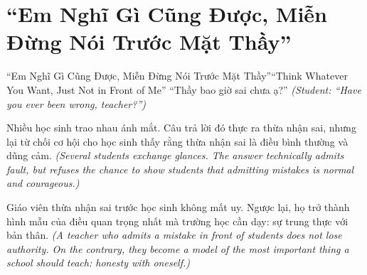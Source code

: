 \section{``Em Nghĩ Gì Cũng Được, Miễn Đừng Nói Trước Mặt Thầy''}
\begin{truyen}{``Em Nghĩ Gì Cũng Được, Miễn Đừng Nói Trước Mặt Thầy''}{``Think Whatever You Want, Just Not in Front of Me''}
 ``Thầy bao giờ sai chưa ạ?''
\textit{(Student: ``Have you ever been wrong, teacher?'')}


Nhiều học sinh trao nhau ánh mắt. Câu trả lời đó thực ra thừa nhận sai, nhưng lại từ chối cơ hội cho học sinh thấy rằng thừa nhận sai là điều bình thường và dũng cảm.
\textit{(Several students exchange glances. The answer technically admits fault, but refuses the chance to show students that admitting mistakes is normal and courageous.)}

\begin{baihoc}
Giáo viên thừa nhận sai trước học sinh không mất uy. Ngược lại, họ trở thành hình mẫu của điều quan trọng nhất mà trường học cần dạy: sự trung thực với bản thân.
\textit{(A teacher who admits a mistake in front of students does not lose authority. On the contrary, they become a model of the most important thing a school should teach: honesty with oneself.)}
\end{baihoc}
\end{truyen}

